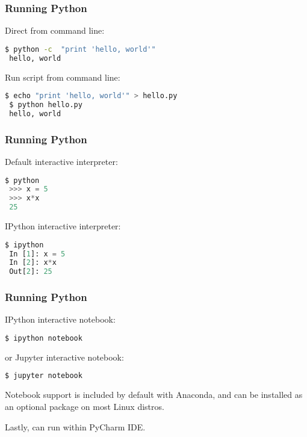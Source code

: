 \documentclass[hyperref={colorlinks, linkcolor=blue, urlcolor=blue}]{beamer}
\begin{document}
\begin{frame}[fragile]
  \frametitle{Running Python}

  Direct from command line:

  \begin{lstlisting}[language=bash]
 $ python -c  "print 'hello, world'"
 hello, world
  \end{lstlisting}

  \bigskip

  Run script from command line:
  
  \begin{lstlisting}[language=bash]
 $ echo "print 'hello, world'" > hello.py
 $ python hello.py 
 hello, world
  \end{lstlisting}  
\end{frame}

\begin{frame}[fragile]
  \frametitle{Running Python}

  Default interactive interpreter:

  \begin{lstlisting}[language=Python]
 $ python
 >>> x = 5
 >>> x*x
 25
  \end{lstlisting}

  \bigskip

  IPython interactive interpreter:
    \begin{lstlisting}[language=Python]
 $ ipython
 In [1]: x = 5
 In [2]: x*x
 Out[2]: 25
  \end{lstlisting}
  
\end{frame}


\begin{frame}[fragile]
  \frametitle{Running Python}

  IPython interactive notebook:

  \begin{lstlisting}[language=bash]
 $ ipython notebook
  \end{lstlisting}
  \bigskip
  or Jupyter interactive notebook:
  \begin{lstlisting}[language=bash]
 $ jupyter notebook
  \end{lstlisting}
  \bigskip
  Notebook support is included by default with Anaconda, and can be installed
  as an optional package on most Linux distros.

  \bigskip

  Lastly, can run within PyCharm IDE.
\end{frame}
\end{document}
